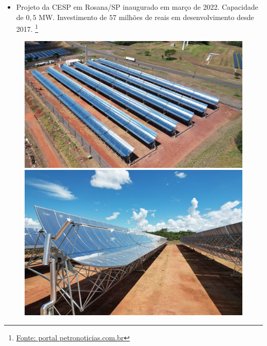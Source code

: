 \documentclass[12pt,notheorems,hyperref={pdfauthor=Professor Rafael Nardi}]{beamer}
\begin{document}
\begin{frame}%

	\begin{itemize} 
		\item Projeto da CESP em Rosana/SP inaugurado em março de 2022. Capacidade
			de $0,5$ MW. Investimento de $57$ milhões de reais em desenvolvimento desde 2017. \footnote{\href{https://petronoticias.com.br/cesp-inaugurou-a-primeira-usina-termossolar-do-pais-em-sao-paulo/}{Fonte: portal petronoticias.com.br}}
	\end{itemize}

	\bigskip

	\begin{figure}[ht]

		\begin{minipage}[b]{.4\linewidth}
			\includegraphics[height=0.62\linewidth]{./CESP_Rosana-SP.jpg}
		\end{minipage}
		\qquad
		\begin{minipage}[b]{.4\linewidth}
			\includegraphics[height=0.62\linewidth]{./CESP_Rosana-SP_2.png}
		\end{minipage}
	\end{figure}

\end{frame}
\end{document}
